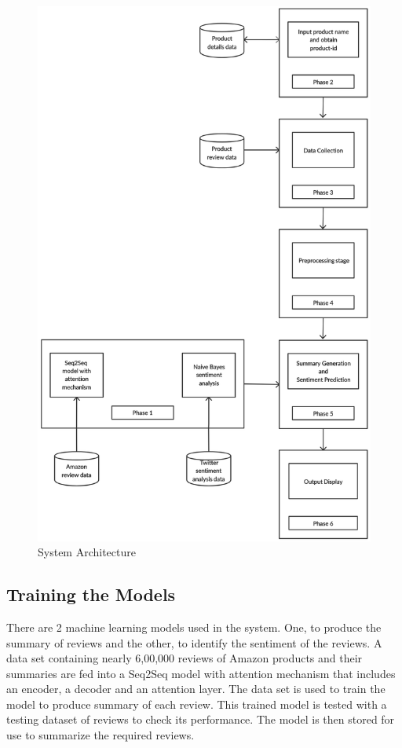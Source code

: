 \documentclass[11pt]{report}
\begin{document}
\begin{figure}[H]
\centering
\includegraphics[scale=0.33]{images/system_architecture.png}
\caption{System Architecture}
\label{fig:sysarch}
\end{figure}



\subsection{Training the Models}
There are 2 machine learning models used in the system. One, to produce the summary of reviews and the other, to identify the sentiment of the reviews. A data set containing nearly 6,00,000 reviews of Amazon products and their summaries are fed into a Seq2Seq model with attention mechanism that includes an encoder, a decoder and an attention layer. The data set is used to train the model to produce summary of each review. This trained model is tested with a testing dataset of reviews to check its performance. The model is then stored for use to summarize the required reviews.\\
\end{document}
